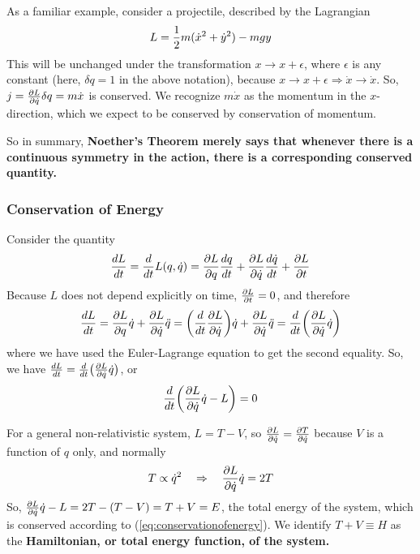 \documentclass[12pt,epsf]{article}
\def\nolabel{\nonumber }
\def\nolabel{\nonumber }
\begin{document}
As a familiar example, consider a projectile, described by the
Lagrangian
\begin{eqnarray}
L = {1\over 2} m (\dot{x}^2 + \dot{y}^2) - mgy \label{eq:projectile}
\end{eqnarray}
This will be unchanged under the transformation $x \rightarrow
x+\epsilon$, where $\epsilon$ is any constant (here, $\delta q=1$ in
the above notation), because $x \rightarrow x+\epsilon \Rightarrow
\dot{x} \rightarrow \dot{x}$.  So, $j = {\partial L \over \partial
\dot{q}} \delta q = m \dot{x}$ is conserved.  We recognize $m\dot{x}$
as the momentum in the $x$-direction, which we expect to be conserved
by conservation of momentum.  

So in summary, \bf Noether's Theorem \rm merely says that whenever there is a
continuous symmetry in the action, there is a corresponding conserved
quantity.   

\subsubsection{Conservation of Energy}

Consider the quantity 
\begin{eqnarray}
{d L \over dt} = {d \over dt} L (q,\dot{q}) = {\partial L \over
\partial q} {dq \over dt} + {\partial L \over \partial \dot{q}}
{d\dot{q} \over dt} + {\partial L \over \partial t} \nolabel 
\end{eqnarray}
Because $L$ does not depend explicitly on time, ${\partial L \over
\partial t} = 0$, and therefore
\begin{eqnarray}
{d L \over dt} = {\partial L \over \partial q}\dot{q} + {\partial L
\over \partial \dot{q}} \ddot{q} = \bigg({d\over dt} {\partial L \over
\partial \dot{q}} \bigg) \dot{q} + {\partial L \over \partial \dot{q}}
\ddot{q} = {d \over dt} \bigg({\partial L \over \partial \dot{q}}
\dot{q}\bigg) \nolabel 
\end{eqnarray}
where we have used the Euler-Lagrange equation to get the second
equality.  So, we have ${d L \over dt} = {d \over dt} \big({\partial L
\over \partial \dot{q}} \dot{q}\big)$, or
\begin{eqnarray}
{d \over dt} \bigg({\partial L \over \partial \dot{q}}\dot{q} - L
\bigg) = 0 \label{eq:conservationofenergy}
\end{eqnarray}

For a general non-relativistic system, $L=T-V$, so ${\partial L \over
\partial \dot{q}} = {\partial T \over \partial \dot{q}}$ because $V$ is
a function of $q$ only, and normally 
\begin{eqnarray}
T \propto \dot{q}^2 \quad \Rightarrow\quad  {\partial L \over \partial \dot{q}} \dot{q} = 2T \nolabel
\end{eqnarray}
So, ${\partial L \over \partial \dot{q}} \dot{q} - L = 2T
- (T-V) = T+V = E$, the total energy of the system, which is conserved
according to (\ref{eq:conservationofenergy}).  We identify $T+V \equiv
H$ as the \bf Hamiltonian\rm, or total energy function, of the system.   
\end{document}
